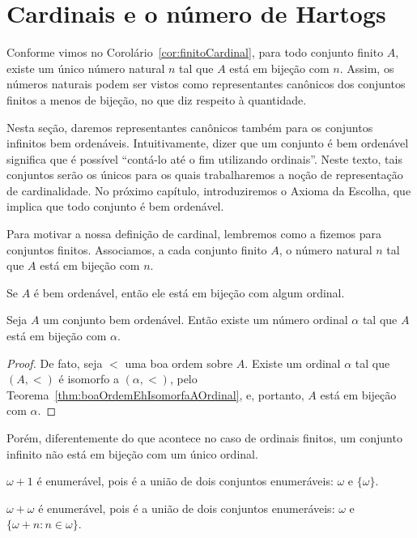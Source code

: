 \section{Cardinais e o número de Hartogs}\label{sec:cardinaisENumeroDeHartogs}

Conforme vimos no Corolário~\ref{cor:finitoCardinal}, para todo conjunto finito $A$, existe um único número natural $n$ tal que $A$ está em bijeção com $n$.
Assim, os números naturais podem ser vistos como representantes canônicos dos conjuntos finitos a menos de bijeção, no que diz respeito à quantidade.

Nesta seção, daremos representantes canônicos também para os conjuntos infinitos bem ordenáveis.
Intuitivamente, dizer que um conjunto é bem ordenável significa que é possível ``contá-lo até o fim utilizando ordinais''.
Neste texto, tais conjuntos serão os únicos para os quais trabalharemos a noção de representação de cardinalidade.
No próximo capítulo, introduziremos o Axioma da Escolha, que implica que todo conjunto é bem ordenável.

Para motivar a nossa definição de cardinal, lembremos como a fizemos para conjuntos finitos.
Associamos, a cada conjunto finito $A$, o número natural $n$ tal que $A$ está em bijeção com $n$.

Se $A$ é bem ordenável, então ele está em bijeção com algum ordinal.
\begin{lemma}\label{lem:bemOrdenavelBijetaComOrdinal}
    Seja $A$ um conjunto bem ordenável.
    Então existe um número ordinal $\alpha$ tal que $A$ está em bijeção com $\alpha$.
\end{lemma}
\begin{proof}
    De fato, seja $<$ uma boa ordem sobre $A$.
    Existe um ordinal $\alpha$ tal que $(A, <)$ é isomorfo a $(\alpha, <)$, pelo Teorema~\ref{thm:boaOrdemEhIsomorfaAOrdinal}, e, portanto, $A$ está em bijeção com $\alpha$.
\end{proof}

Porém, diferentemente do que acontece no caso de ordinais finitos, um conjunto infinito não está em bijeção com um único ordinal.

\begin{example}\label{exa:omegaMaisUmEhEnumeravel}
    $\omega+1$ é enumerável, pois é a união de dois conjuntos enumeráveis: $\omega$ e $\{\omega\}$.
\end{example}
\begin{example}\label{exa:omegaMaisOmegaEhEnumeravel}
    $\omega+\omega$ é enumerável, pois é a união de dois conjuntos enumeráveis: $\omega$ e $\{\omega+n : n\in \omega\}$.
\end{example}

